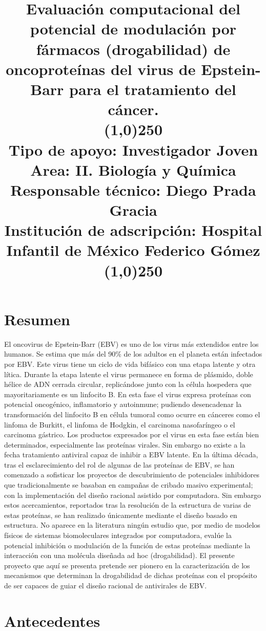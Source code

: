 \documentclass[12pt,letterpaper]{article} %
\title{Evaluación computacional del potencial de modulación por fármacos (drogabilidad) de oncoproteínas del
  virus de Epstein-Barr para el tratamiento del cáncer. \\
  \vspace*{0.5\baselineskip}
  \line(1,0){250}\\
  \small{Tipo de apoyo: Investigador Joven} \\
  \small{Area: II. Biología y Química}\\
  \vspace*{0.5\baselineskip}
  \small{Responsable técnico: Diego Prada Gracia} \\
  \small{Institución de adscripción: Hospital Infantil de México Federico Gómez}\\
  \line(1,0){250}
}
\author[]{}
\date{}
\begin{document}
 
\maketitle

\section{Resumen}

El oncovirus de Epstein-Barr (EBV) es uno de los virus más extendidos entre los
humanos. Se estima que más del 90$\%$ de los adultos en el planeta están
infectados por EBV. Este virus tiene un ciclo de vida bifásico con una etapa
latente y otra lítica. Durante la etapa latente el virus permanece en forma de
plásmido, doble hélice de ADN cerrada circular, replicándose junto con la célula
hospedera que mayoritariamente es un linfocito B. En esta fase el virus expresa
proteínas con potencial oncogénico, inflamatorio y autoinmune; pudiendo
desencadenar la transformación del linfocito B en célula tumoral como ocurre en
cánceres como el linfoma de Burkitt, el linfoma de Hodgkin, el carcinoma
nasofaríngeo o el carcinoma gástrico. Los productos expresados por el virus en
esta fase están bien determinados, especialmente las proteínas virales. Sin
embargo no existe a la fecha tratamiento antiviral capaz de inhibir a EBV
latente. En la última década, tras el esclarecimiento
del rol de algunas de las proteínas de EBV, se han comenzado a sofisticar los
proyectos de descubrimiento de potenciales inhibidores que tradicionalmente se
basaban en campañas de cribado masivo experimental; con la implementación del
diseño racional asistido por computadora. Sin embargo estos acercamientos,
reportados tras la resolución de la estructura de varias de estas proteínas, se
han realizado únicamente mediante el diseño basado en estructura. No aparece en
la literatura ningún estudio que, por medio de modelos físicos de sistemas
biomoleculares integrados por computadora, evalúe la potencial inhibición
o modulación de la función de estas proteínas mediante la interacción con una
molécula diseñada ad hoc (drogabilidad). El presente proyecto que aquí se
presenta pretende ser pionero en la caracterización de los mecanismos que
determinan la drogabilidad de dichas proteínas con el propósito de
ser capaces de guiar el diseño racional de antivirales de EBV.


\section{Antecedentes}
\end{document}
